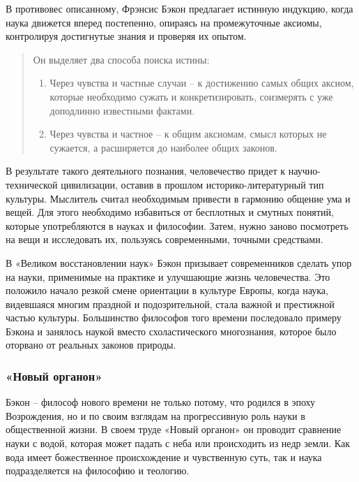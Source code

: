 \documentclass[a4paper, 14pt]{extreport}
\begin{document}
В противовес описанному, Фрэнсис Бэкон предлагает истинную индукцию,
когда наука движется вперед постепенно, опираясь на промежуточные
аксиомы, контролируя достигнутые знания и проверяя их опытом.

\begin{quote}
Он выделяет два способа поиска истины:

\begin{enumerate}
\def\labelenumi{\arabic{enumi}.}
\item
  Через чувства и частные случаи -- к достижению самых общих аксиом,
  которые необходимо сужать и конкретизировать, соизмерять с уже
  доподлинно известными фактами.
\item
  Через чувства и частное -- к общим аксиомам, смысл которых не
  сужается, а расширяется до наиболее общих законов.
\end{enumerate}
\end{quote}

В результате такого деятельного познания, человечество придет к
научно-технической цивилизации, оставив в прошлом историко-литературный
тип культуры. Мыслитель считал необходимым привести в гармонию общение
ума и вещей. Для этого необходимо избавиться от бесплотных и смутных
понятий, которые употребляются в науках и философии. Затем, нужно заново
посмотреть на вещи и исследовать их, пользуясь современными, точными
средствами.

В «Великом восстановлении наук» Бэкон призывает современников сделать
упор на науки, применимые на практике и улучшающие жизнь человечества.
Это положило начало резкой смене ориентации в культуре Европы, когда
наука, видевшаяся многим праздной и подозрительной, стала важной и
престижной частью культуры. Большинство философов того времени
последовало примеру Бэкона и занялось наукой вместо схоластического
многознания, которое было оторвано от реальных законов природы.

\subsubsection{«Новый органон»}

Бэкон -- философ нового времени не только потому, что родился в эпоху
Возрождения, но и по своим взглядам на прогрессивную роль науки в
общественной жизни. В своем труде «Новый органон» он проводит сравнение
науки с водой, которая может падать с неба или происходить из недр
земли. Как вода имеет божественное происхождение и чувственную суть, так
и наука подразделяется на философию и теологию.
\end{document}
